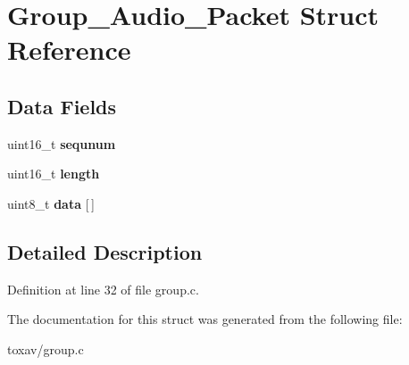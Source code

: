 \hypertarget{struct_group___audio___packet}{\section{Group\+\_\+\+Audio\+\_\+\+Packet Struct Reference}
\label{struct_group___audio___packet}
}
\subsection*{Data Fields}
\begin{DoxyCompactItemize}
\item 
\hypertarget{struct_group___audio___packet_afe208c7dec97b8f61e08094e61bf096e}{uint16\+\_\+t {\bfseries sequnum}}\label{struct_group___audio___packet_afe208c7dec97b8f61e08094e61bf096e}

\item 
\hypertarget{struct_group___audio___packet_a1892eba2086d12ac2b09005aeb09ea3b}{uint16\+\_\+t {\bfseries length}}\label{struct_group___audio___packet_a1892eba2086d12ac2b09005aeb09ea3b}

\item 
\hypertarget{struct_group___audio___packet_a5c239a1bb87b52b0f1d6d68c4749cd2a}{uint8\+\_\+t {\bfseries data} \mbox{[}$\,$\mbox{]}}\label{struct_group___audio___packet_a5c239a1bb87b52b0f1d6d68c4749cd2a}

\end{DoxyCompactItemize}


\subsection{Detailed Description}


Definition at line 32 of file group.\+c.



The documentation for this struct was generated from the following file\+:\begin{DoxyCompactItemize}
\item 
toxav/group.\+c\end{DoxyCompactItemize}
